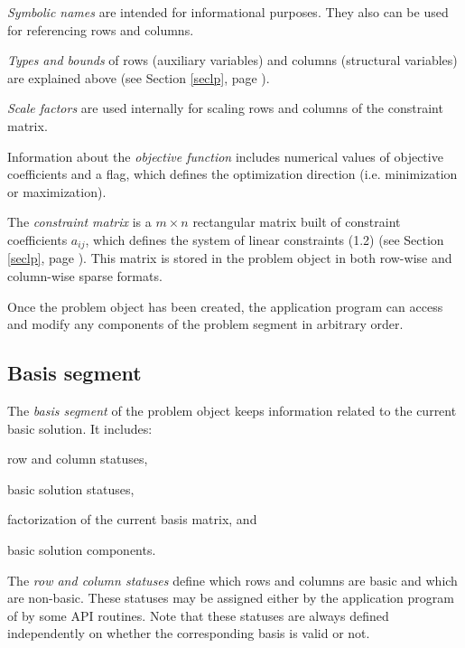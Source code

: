 {\it Symbolic names} are intended for informational purposes. They also
can be used for referencing rows and columns.

{\it Types and bounds} of rows (auxiliary variables) and columns
(structural variables) are explained above (see Section \ref{seclp},
page \pageref{seclp}).

{\it Scale factors} are used internally for scaling rows and columns of
the constraint matrix.

Information about the {\it objective function} includes numerical
values of objective coefficients and a flag, which defines the
optimization direction (i.e. minimization or maximization).

The {\it constraint matrix} is a $m \times n$ rectangular matrix built
of constraint coefficients $a_{ij}$, which defines the system of linear
constraints (1.2) (see Section \ref{seclp}, page \pageref{seclp}). This
matrix is stored in the problem object in both row-wise and column-wise
sparse formats.

Once the problem object has been created, the application program can
access and modify any components of the problem segment in arbitrary
order.

\subsection{Basis segment}

The {\it basis segment} of the problem object keeps information related
to the current basic solution. It includes:


\Item{---}row and column statuses,

\Item{---}basic solution statuses,

\Item{---}factorization of the current basis matrix, and

\Item{---}basic solution components.


The {\it row and column statuses} define which rows and columns are
basic and which are non-basic. These statuses may be assigned either by
the application program of by some API routines. Note that these
statuses are always defined independently on whether the corresponding
basis is valid or not.

